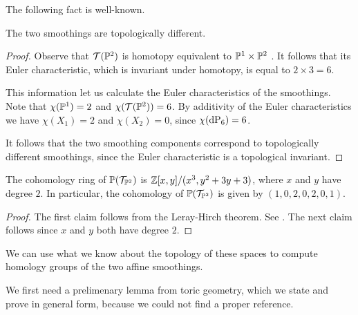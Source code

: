 The following fact is well-known.

\begin{proposition}
The two smoothings are topologically different.
\end{proposition}
\begin{proof}
Observe that $\mathcal T(\P^2)$ is homotopy equivalent to $\P^1 \times \P^2$ . It follows that its Euler characteristic, which is invariant under homotopy, is equal to $2 \times 3=6$.

This information let us calculate the Euler characteristics of the smoothings. Note that $\chi(\P^1)=2$ and $\chi(\mathcal T(\P^2))=6$. By additivity of the Euler characteristics we have $\chi(X_1)=2$ and $\chi(X_2)=0$, since $\chi(\dP6)=6$.

It follows that the two smoothing components correspond to topologically different smoothings, since the Euler characteristic is a topological invariant.
\end{proof}

\begin{lemma}
The cohomology ring of $\P(\mathcal T_{\P^2})$ is $\Z[x,y]/(x^3,y^2+3y+3)$, where $x$ and $y$ have degree $2$. In particular, the cohomology of $\P(\mathcal T_{\P^2})$ is given by $(1,0,2,0,2,0,1)$.
\end{lemma}
\begin{proof}
The first claim follows from the Leray-Hirch theorem. See \cite[page 270]{bott_tu}. The next claim follows since $x$ and $y$ both have degree $2$.
\end{proof}

We can use what we know about the topology of these spaces to compute homology groups of the two affine smoothings.

We first need a prelimenary lemma from toric geometry, which we state and prove in general form, because we could not find a proper reference.

